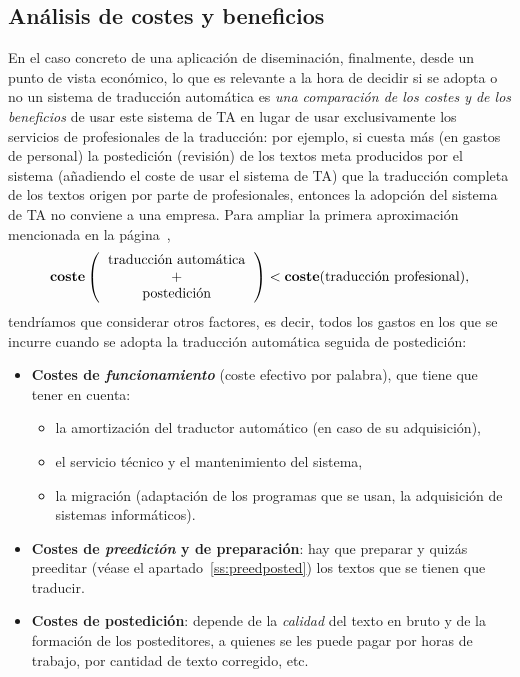 \subsection{Análisis de costes y beneficios} \label{ss:costdetall} En el caso concreto de una aplicación de diseminación, finalmente, desde un punto de vista económico, lo que es relevante a la hora de decidir si se adopta o no un sistema de traducción automática es \emph{una comparación de los costes y de los beneficios} de usar este sistema de TA en lugar de usar exclusivamente los servicios de profesionales de la traducción: por ejemplo, si cuesta más (en gastos de personal) la postedición (revisión) de los textos meta producidos por el sistema (añadiendo el coste de usar el sistema de TA) que la traducción completa de los textos origen por parte de profesionales, entonces la adopción del sistema de TA no conviene a una empresa. Para ampliar la primera aproximación mencionada en la página~\pageref{pg:cost}, $$\textbf{coste}\left(\mbox{\begin{tabular}{c}traducción automática\\ +\\ postedición\end{tabular}}\right) < \textbf{coste}(\mbox{traducción profesional}), $$ tendríamos que considerar otros factores, es decir, todos los gastos en los que se incurre cuando se adopta la traducción automática seguida de postedición: \begin{itemize} \item \textbf{Costes de \emph{funcionamiento}} (coste efectivo por palabra), que tiene que tener en cuenta: \begin{itemize} \item la amortización del traductor automático (en caso de su adquisición), \item el servicio técnico y el mantenimiento del sistema, \item la migración (adaptación de los programas que se usan, la adquisición de sistemas informáticos). \end{itemize} 

\item \textbf{Costes de \emph{preedición} y de preparación}: hay que preparar y quizás preeditar (véase el apartado~\ref{ss:preedposted}) los textos que se tienen que traducir. 

\item \textbf{Costes de postedición}: depende de la \emph{calidad} del texto en bruto y de la formación de los posteditores, a quienes se les puede pagar por horas de trabajo, por cantidad de texto corregido, etc. 


\end{itemize}
